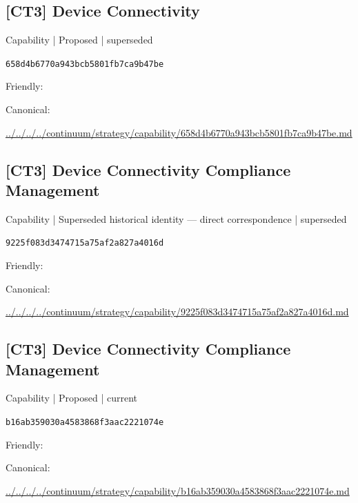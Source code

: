 \documentclass[10pt,a4paper]{article}
\begin{document}
\subsection*{[CT3] Device Connectivity}
{\small Capability | Proposed | superseded}\par
\texttt{658d4b6770a943bcb5801fb7ca9b47be}\par
Friendly: \par
Canonical: \par
{\footnotesize\url{../../../../continuum/strategy/capability/658d4b6770a943bcb5801fb7ca9b47be.md}}\par
\subsection*{[CT3] Device Connectivity Compliance Management}
{\small Capability | Superseded historical identity — direct correspondence | superseded}\par
\texttt{9225f083d3474715a75af2a827a4016d}\par
Friendly: \par
Canonical: \par
{\footnotesize\url{../../../../continuum/strategy/capability/9225f083d3474715a75af2a827a4016d.md}}\par
\subsection*{[CT3] Device Connectivity Compliance Management}
{\small Capability | Proposed | current}\par
\texttt{b16ab359030a4583868f3aac2221074e}\par
Friendly: \par
Canonical: \par
{\footnotesize\url{../../../../continuum/strategy/capability/b16ab359030a4583868f3aac2221074e.md}}\par
\end{document}
